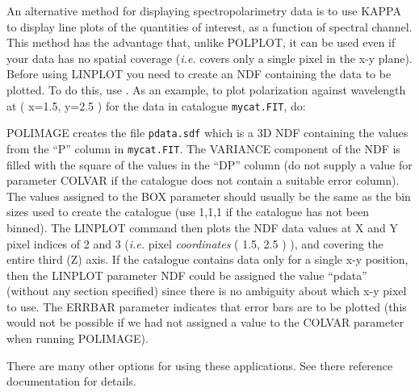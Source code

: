 \documentclass[twoside,11pt]{starlink}
\begin{document}
An alternative method for displaying spectropolarimetry data is to use
KAPPA  to display line plots of the
quantities of interest, as a function of spectral channel. This method
has the advantage that, unlike POLPLOT, it can be used even if your data
has no spatial coverage (\emph{i.e.} covers only a single pixel in the
x-y plane). Before using LINPLOT you need to create an NDF containing the
data to be plotted. To do this, use . As an
example, to plot polarization against wavelength at ( x=1.5, y=2.5 ) for
the data in catalogue \texttt{mycat.FIT}, do:

\begin{terminalv}
\end{terminalv}

POLIMAGE creates the file \texttt{pdata.sdf} which is a 3D NDF containing
the values from the ``P'' column in \texttt{mycat.FIT}. The VARIANCE
component of the NDF is filled with the square of the values in the
``DP'' column (do not supply a value for parameter COLVAR if the
catalogue does not contain a suitable error column). The values assigned
to the BOX parameter should usually be the same as the bin sizes used to
create the catalogue (use 1,1,1 if the catalogue has not been binned).
The LINPLOT command then plots the NDF data values at X and Y pixel
indices of 2 and 3 (\emph{i.e.} pixel \emph{coordinates} ( 1.5, 2.5 ) ),
and covering the entire third (Z) axis. If the catalogue contains data
only for a single x-y position, then the LINPLOT parameter NDF could be
assigned the value ``pdata'' (without any section specified) since there
is no ambiguity about which x-y pixel to use. The ERRBAR parameter
indicates that error bars are to be plotted (this would not be possible
if we had not assigned a value to the COLVAR parameter when running
POLIMAGE).

There are many other options for using these applications. See there
reference documentation for details.
\end{document}
